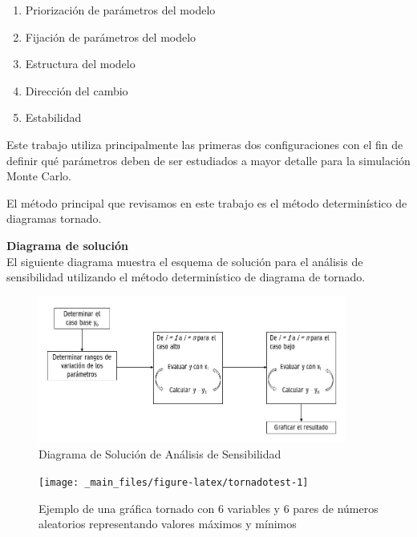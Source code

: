 \documentclass[
]{book}
\providecommand{\tightlist}{%
  \setlength{\itemsep}{0pt}\setlength{\parskip}{0pt}}
\begin{document}
\begin{enumerate}
\def\labelenumi{\arabic{enumi}.}
\tightlist
\item
  Priorización de parámetros del modelo
\item
  Fijación de parámetros del modelo
\item
  Estructura del modelo
\item
  Dirección del cambio
\item
  Estabilidad
\end{enumerate}

Este trabajo utiliza principalmente las primeras dos configuraciones con el fin de definir qué parámetros deben de ser estudiados a mayor detalle para la simulación Monte Carlo.

El método principal que revisamos en este trabajo es el método determinístico de diagramas tornado.

\newpage

\textbf{Diagrama de solución}\\
El siguiente diagrama muestra el esquema de solución para el análisis de sensibilidad utilizando el método determinístico de diagrama de tornado.

\begin{figure}
\centering
\includegraphics[width=0.9\textwidth,height=\textheight]{Diagramas/AnalisisSensibilidad.jpg}
\caption{Diagrama de Solución de Análisis de Sensibilidad}
\end{figure}

\begin{figure}

{\centering \texttt{[image: \_main\_files/figure-latex/tornadotest-1]} 

}

\caption{Ejemplo de una gráfica tornado con 6 variables y 6 pares de números aleatorios representando valores máximos y mínimos}\label{fig:tornadotest}
\end{figure}
\end{document}
